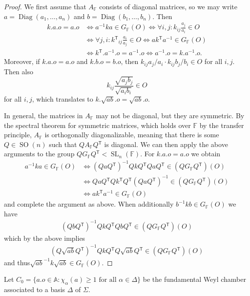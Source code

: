 \documentclass[12pt]{amsart}
\newcommand{\F}{\mathbb{F} }
\newcommand{\A}{\mathbb{A}}
\newcommand{\tran}{{^{\mathsf{T}}\!}}
\numberwithin{equation}{section}
\theoremstyle{remark} %
\begin{document}
\begin{proof}
	We first assume that $A_\F$ consists of diagonal matrices, so we may write $a = \operatorname{Diag}(a_1, \ldots, a_n)$ and $b = \operatorname{Diag}(b_1,\ldots, b_n)$. Then
	\begin{align*}
		k.a.o = a.o & \iff a^{-1}ka \in G_\F(O) \iff \forall i,j\colon  k_{ij}\frac{a_j}{a_i} \in O \\
		&\iff \forall j,i \colon k\tran_{ij}\frac{a_i}{a_j} \in O \iff ak\tran a^{-1 } \in G_\F(O) \\
		&\iff k\tran.a^{-1}.o = a^{-1}.o \iff a^{-1}.o = k.a^{-1 }.o.
	\end{align*}
	Moreover, if $k.a.o = a.o$ and $k.b.o=b.o$, then $k_{ij}a_j/a_i \cdot k_{ij} b_j/b_i \in O$ for all $i,j$. Then also
	$$
	k_{ij} \frac{\sqrt{a_jb_j}}{\sqrt{a_ib_i}} \in O
	$$
	for all $i,j$, which translates to $k.\sqrt{ab}.o = \sqrt{ab}.o$.
	
	In general, the matrices in $A_\F$ may not be diagonal, but they are symmetric. By the spectral theorem for symmetric matrices, which holds over $\F$ by the transfer principle, $A_\F$ is orthogonally diagonalizable, meaning that there is some $Q \in \operatorname{SO}(n)$ such that $QA_\F Q\tran$ is diagonal. We can then apply the above arguments to the group $QG_\F Q\tran < \operatorname{SL}_n(\F)$. %
	For $k.a.o = a.o$ we obtain
	\begin{align*}
		a^{-1}ka \in G_\F(O) & \iff (QaQ\tran)^{-1} QkQ\tran QaQ\tran \in (QG_\F Q\tran)(O) \\
		&\iff QaQ\tran Qk\tran Q\tran (QaQ\tran)^{-1} \in (QG_\F Q\tran)(O) \\
		&\iff ak\tran a^{-1} \in G_\F(O)
	\end{align*}
	and complete the argument as above. When additionally $b^{-1}kb \in G_\F(O)$ we have
	\begin{align*}
		(QbQ\tran)^{-1} QkQ\tran QbQ\tran \in (QG_\F Q\tran)(O) 
	\end{align*}
	which by the above implies
	\begin{align*}
		(Q\sqrt{ab}Q\tran)^{-1} QkQ\tran Q\sqrt{ab}Q\tran \in (QG_\F Q\tran)(O)
	\end{align*}
	and thus$
	\sqrt{ab}^{-1}k\sqrt{ab} \in G_\F(O).
	$
\end{proof}

Let $C_0 = \{ a.o \in \A  \colon \chi_\alpha(a) \geq 1 \text{ for all } \alpha \in \Delta\}$ be the fundamental Weyl chamber associated to a basis $\Delta$ of $\Sigma$. 
\end{document}
